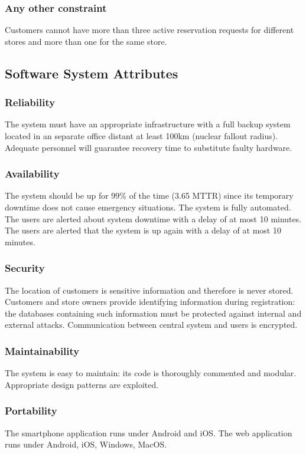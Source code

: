 \subsubsection{Any other constraint}
Customers cannot have more than three active reservation requests for different stores and more than one for the same store.
\subsection{Software System Attributes}
\subsubsection{Reliability}
The system must have an appropriate infrastructure with a full backup system located in an separate office distant at least 100km (nuclear fallout radius). Adequate personnel will guarantee recovery time to substitute faulty hardware.
\subsubsection{Availability}
The system should be up for 99\% of the time (3.65 MTTR) since its temporary downtime does not cause emergency situations. The system is fully automated. The users are alerted about system downtime with a delay of at most 10 minutes. The users are alerted that the system is up again with a delay of at most 10 minutes.
\subsubsection{Security}
The location of customers is sensitive information and therefore is never stored. Customers and store owners provide identifying information during registration: the databases containing such information must be protected against internal and external attacks. Communication between central system and users is encrypted.
\subsubsection{Maintainability}
The system is easy to maintain: its code is thoroughly commented and modular. Appropriate design patterns are exploited.
\subsubsection{Portability}
The smartphone application runs under Android and iOS. The web application runs under Android, iOS, Windows, MacOS.